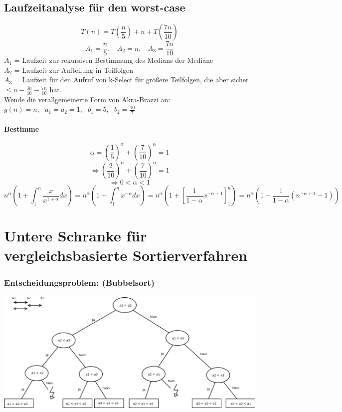 \subsection{Laufzeitanalyse für den worst-case}
\[T(n) = T(\frac{n}{5})+n+T(\frac{7n}{10}) \]
\[A_1 = \frac{n}{5},~~~~A_2 = n,~~~~A_3= \frac{7n}{10}\]
$A_1$ = Laufzeit zur rekursiven Bestimmung des Medians der Mediane\\
$A_2$ = Laufzeit zur Aufteilung in Teilfolgen\\
$A_3$ = Laufzeit für den Aufruf von k-Select  für größere Teilfolgen, die aber sicher $\leq n - \frac{3n}{10} - \frac{7n}{10}$ hat.\\

Wende die verallgemeinerte Form von Akra-Brazzi an:\\
$g(n)=n, ~~~a_1=a_2=1, ~~~b_1=5, ~~~b_2=\frac{10}{7}$\\
\paragraph{Bestimme}
\[\alpha = (\frac{1}{5})^{\alpha} + (\frac{7}{10})^{\alpha} = 1\]
\[\Leftrightarrow (\frac{2}{10})^{\alpha} + (\frac{7}{10})^{\alpha} = 1\]
\[\Rightarrow 0 < \alpha < 1 \]
\[n^{\alpha}(1+\int_1^n \frac{x}{x^{1+\alpha}} dx) = n^{\alpha}(1+\int_1^n x^{-\alpha} dx) = n^{\alpha}(1+[\frac{1}{1-\alpha} x^{-\alpha+1}]_1^n) = n^{\alpha}(1+\frac{1}{1-\alpha} (n^{-\alpha+1}-1))\]

\newpage

\section{Untere Schranke für vergleichsbasierte Sortierverfahren}
\subsubsection*{Entscheidungsproblem: (Bubbelsort)}
\includegraphics[width=\linewidth]{8/Grafik/img2.png}\\

